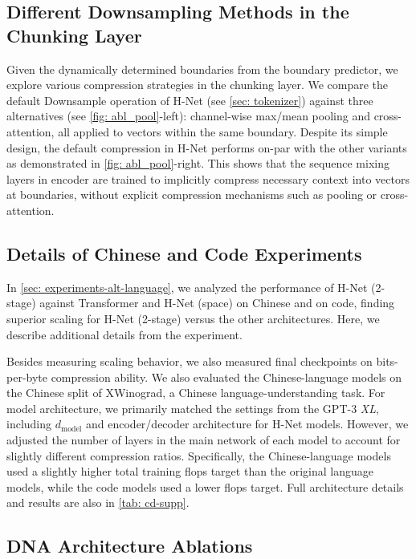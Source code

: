 \documentclass{article}
\newcommand{\model}{H-Net}
\newcommand{\chunk}{chunking layer}
\newcommand{\main}{main network}
\theoremstyle{plain}
\theoremstyle{remark}
\begin{document}
\subsection{Different Downsampling Methods in the Chunking Layer}
\label{sec: Appendix-Various-Compression}
Given the dynamically determined boundaries from the boundary predictor, we explore various compression strategies in the \chunk{}.
We compare the default Downsample operation of \model{} (see \cref{sec: tokenizer}) against three alternatives (see \cref{fig: abl_pool}-left): channel-wise max/mean pooling and cross-attention, all applied to vectors within the same boundary.
Despite its simple design, the default compression in \model{} performs on-par with the other variants as demonstrated in \cref{fig: abl_pool}-right.
This shows that the sequence mixing layers in encoder are trained to implicitly compress necessary context into vectors at boundaries, without explicit compression mechanisms such as pooling or cross-attention.

\subsection{Details of Chinese and Code Experiments}

In \cref{sec: experiments-alt-language}, we analyzed the performance of \model{} (2-stage) against Transformer and \model{} (space) on Chinese and on code, finding superior scaling for \model{} (2-stage) versus the other architectures.
Here, we describe additional details from the experiment.

Besides measuring scaling behavior, we also measured final checkpoints on bits-per-byte compression ability.
We also evaluated the Chinese-language models on the Chinese split of XWinograd, a Chinese language-understanding task.
For model architecture, we primarily matched the settings from the GPT-3 \textit{XL}, including $d_{\text{model}}$ and encoder/decoder architecture for \model{} models.
However, we adjusted the number of layers in the \main{} of each model to account for slightly different compression ratios.
Specifically, the Chinese-language models used a slightly higher total training flops target than the original language models, while the code models used a lower flops target.
Full architecture details and results are also in \cref{tab: cd-supp}.

\subsection{DNA Architecture Ablations}
\end{document}
